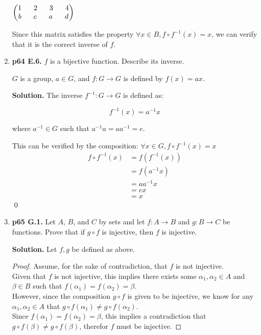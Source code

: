 \documentclass[11pt]{article}
\begin{document}
\begin{enumerate}
	$\begin{pmatrix}
		1 \hspace{6mm} 2 \hspace{6mm} 3 \hspace{6mm} 4 \\
		b \hspace{6mm} c \hspace{6mm} a \hspace{6mm} d \\
	\end{pmatrix}$
	
	Since this matrix satisfies the property $\forall x \in B, f \circ f^{-1} (x) = x$, we can verify that it is the correct inverse of $f$.

\item {\bfseries p64 E.6.} $f$ is a bijective function. Describe its inverse.

	$G$ is a group, $a \in G$, and $f : G \rightarrow G$ is defined by $f(x) = ax$.
  
	{\bfseries Solution.} The inverse $f^{-1}: G \rightarrow G$ is defined as:
	
	$$f^{-1}(x) = a^{-1}x$$
	
	where $a^{-1} \in G$ such that $a^{-1}a = aa^{-1} = e$.
	
	This can be verified by the composition: $\forall x \in G, f \circ f^{-1} (x) = x$
	\begin{align*}
		f \circ f^{-1} (x) &= f(f^{-1}(x)) \\
		&= f(a^{-1}x) \\
		&= aa^{-1}x \\
		&= ex \\
		&= x
	\end{align*} \qed
  
\newpage

\item {\bfseries p65 G.1.} Let $A$, $B$, and $C$ by sets and let $f: A \rightarrow B$ and $g: B \rightarrow C$ be functions. Prove that if $g \circ f$ is injective, then $f$ is injective.
  
	{\bfseries Solution.} Let $f, g$ be defined as above.
	
	\begin{proof} 
		Assume, for the sake of contradiction, that $f$ is not injective. \\
		Given that $f$ is not injective, this implies there exists some $\alpha_1, \alpha_2 \in A$ and $\beta \in B$ such that $f(\alpha_1) = f(\alpha_2) = \beta$. \\
		However, since the composition $g \circ f$ is given to be injective, we know for any $\alpha_1, \alpha_2 \in A$ that $g \circ f (\alpha_{1}) \ne g \circ f (\alpha_{2})$. \\
		Since $f(\alpha_1) = f(\alpha_2) = \beta$, this implies a contradiction that $g \circ f (\beta) \neq g \circ f (\beta)$, therefor $f$ must be injective.
	\end{proof}


\end{enumerate}
\end{document}
